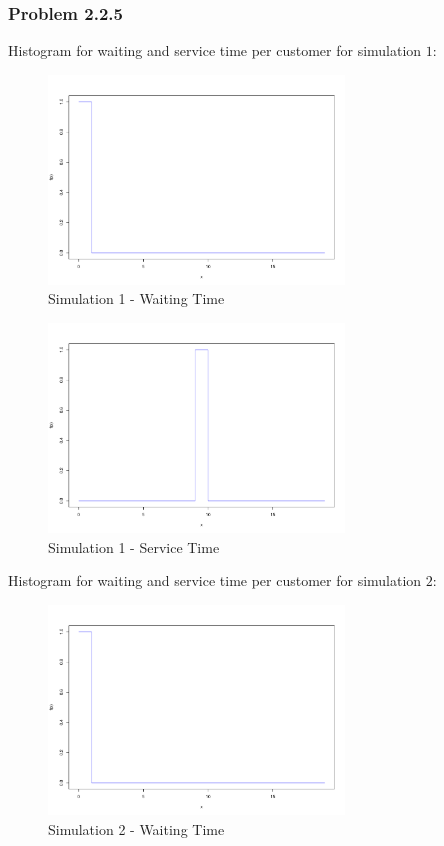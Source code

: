 \subsubsection*{Problem 2.2.5}
Histogram for waiting and service time per customer for simulation $1$:\\
\begin{figure}[H]
	\centering
  \includegraphics[width=0.7\textwidth]{serie_02/data/Simulation1/waiting_time.pdf}
	\caption{Simulation 1 - Waiting Time}
	\label{fig3}
\end{figure}
\begin{figure}[H]
	\centering
  \includegraphics[width=0.7\textwidth]{serie_02/data/Simulation1/service_time.pdf}
	\caption{Simulation 1 - Service Time}
	\label{fig3}
\end{figure}
\newpage
Histogram for waiting and service time per customer for simulation $2$:\\
\begin{figure}[H]
	\centering
  \includegraphics[width=0.7\textwidth]{serie_02/data/Simulation2/waiting_time.pdf}
	\caption{Simulation 2 - Waiting Time}
	\label{fig3}
\end{figure}

